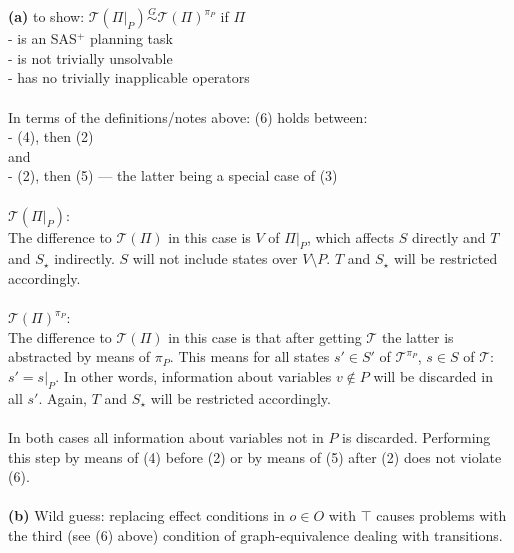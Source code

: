 \documentclass[11pt,a4paper]{article}
\begin{document}
\textbf{(a)} to show: $\mathscr{T}(\Pi|_P)\stackrel{G}{\sim}\mathscr{T}(\Pi)^{\pi_P}$ if $\Pi$\\
\hphantom{tabtab}- is an SAS$^+$ planning task\\
\hphantom{tabtab}- is not trivially unsolvable\\
\hphantom{tabtab}- has no trivially inapplicable operators\\
\\
In terms of the definitions/notes above: (6) holds between:\\
\hphantom{tabtab}- (4), then (2)\\
\hphantom{tabtab}and\\
\hphantom{tabtab}- (2), then (5) --- the latter being a special case of (3)\\
\\
$\mathscr{T}(\Pi|_P)$:\\
The difference to $\mathscr{T}(\Pi)$ in this case is $V$ of $\Pi|_P$, which affects $S$ directly and $T$ and $S_\star$ indirectly. $S$ will not include states over $V\setminus P$. $T$ and $S_\star$ will be restricted accordingly.\\
\\
$\mathscr{T}(\Pi)^{\pi_P}$:\\
The difference to $\mathscr{T}(\Pi)$ in this case is that after getting $\mathscr{T}$ the latter is abstracted by means of $\pi_P$. This means for all states $s'\in S'$ of $\mathscr{T}^{\pi_P}$, $s\in S$ of $\mathscr{T}$: $s'=s|_P$. In other words, information about variables $v\notin P$ will be discarded in all $s'$. Again, $T$ and $S_\star$ will be restricted accordingly.\\
\\
In both cases all information about variables not in $P$ is discarded. Performing this step by means of (4) before (2) or by means of (5) after (2) does not violate (6).\\
\\
\textbf{(b)} Wild guess: replacing effect conditions in $o\in O$ with $\top$ causes problems with the third (see (6) above) condition of graph-equivalence dealing with transitions.

\label{lastpage}
\end{document}
